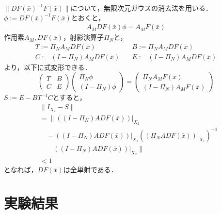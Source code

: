 \documentclass[a4paper,10pt,twocolumn]{jsarticle}
\begin{document}
$\|DF(\bar{x})^{-1} F(\bar{x})\|$について，無限次元ガウスの消去法を用いる．
$\phi := DF(\bar{x})^{-1} F(\bar{x})$とおくと，
\begin{equation}
  \begin{split}
    A_M DF(\bar{x})\phi = A_M F(\bar{x})
  \end{split}
\end{equation}
作用素$A_M, DF(\bar{x})$，射影演算子$\Pi_N$と，
\begin{equation}
  \label{eq:def_lo}
  \begin{split}
  T:= \Pi_N A_M DF(\bar{x}) \quad &
  B:= \Pi_N A_M DF(\bar{x}) \\
  C:= (I-\Pi_N) A_M DF(\bar{x}) \quad &
  E:= (I-\Pi_N) A_M DF(\bar{x}) 
\end{split}
\end{equation}
より，以下に式変形できる．
\begin{equation}
  \begin{pmatrix}
    T & B \\
    C & E
  \end{pmatrix}
  \begin{pmatrix}
    \Pi_N \phi \\
    (I -\Pi_N) \phi
  \end{pmatrix}
  =
  \begin{pmatrix}
    \Pi_N A_M F(\bar{x}) \\
    (I - \Pi_N) A_M F(\bar{x})
  \end{pmatrix}
\end{equation}
$S:= E-BT^{-1}C$とすると，
\begin{equation}
  \begin{split}
    &\| I_{X_2} - S\|\\
    &= \| \left( \left( I-\Pi_N \right) ADF ( \bar{x} ) \right)|_{X_2}  \\
    &\quad -(\left( I-\Pi_N \right) ADF( \bar{x} ))|_{X_1} \left((\Pi_N ADF(\bar{x}))|_{X_1}\right)^{-1}\\
    &\qquad ((I-\Pi_N)ADF(\bar{x}))|_{X_2} \| \\
    & < 1
  \end{split}
\end{equation}
となれば，$DF(\bar{x})$は全単射である．

\vspace{-1mm}
\section{実験結果}
\vspace{-1mm}
\end{document}
